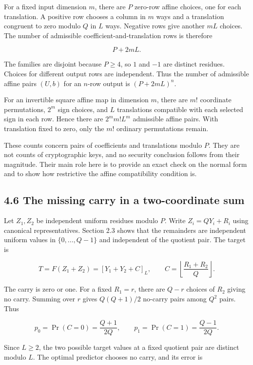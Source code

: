 \documentclass[
]{article}
\begin{document}
For a fixed input dimension \(m\), there are \(P\) zero-row affine
choices, one for each translation. A positive row chooses a column in
\(m\) ways and a translation congruent to zero modulo \(Q\) in \(L\)
ways. Negative rows give another \(mL\) choices. The number of
admissible coefficient-and-translation rows is therefore

\[
P+2mL.
\]

The families are disjoint because \(P\ge4\), so \(1\) and \(-1\) are
distinct residues. Choices for different output rows are independent.
Thus the number of admissible affine pairs \((U,b)\) for an \(n\)-row
output is \((P+2mL)^n\).

For an invertible square affine map in dimension \(m\), there are \(m!\)
coordinate permutations, \(2^m\) sign choices, and \(L\) translations
compatible with each selected sign in each row. Hence there are
\(2^m m!L^m\) admissible affine pairs. With translation fixed to zero,
only the \(m!\) ordinary permutations remain.

These counts concern pairs of coefficients and translations modulo
\(P\). They are not counts of cryptographic keys, and no security
conclusion follows from their magnitude. Their main role here is to
provide an exact check on the normal form and to show how restrictive
the affine compatibility condition is.

\subsection{4.6 The missing carry in a two-coordinate
sum}\label{the-missing-carry-in-a-two-coordinate-sum}

Let \(Z_1,Z_2\) be independent uniform residues modulo \(P\). Write
\(Z_i=QY_i+R_i\) using canonical representatives. Section 2.3 shows that
the remainders are independent uniform values in \(\{0,\ldots,Q-1\}\)
and independent of the quotient pair. The target is

\[
T=F(Z_1+Z_2)=[Y_1+Y_2+C]_L,
\qquad C=\left\lfloor\frac{R_1+R_2}Q\right\rfloor.
\]

The carry is zero or one. For a fixed \(R_1=r\), there are \(Q-r\)
choices of \(R_2\) giving no carry. Summing over \(r\) gives
\(Q(Q+1)/2\) no-carry pairs among \(Q^2\) pairs. Thus

\[
p_0=\Pr(C=0)=\frac{Q+1}{2Q},\qquad
p_1=\Pr(C=1)=\frac{Q-1}{2Q}.
\]

Since \(L\ge2\), the two possible target values at a fixed quotient pair
are distinct modulo \(L\). The optimal predictor chooses no carry, and
its error is
\end{document}
